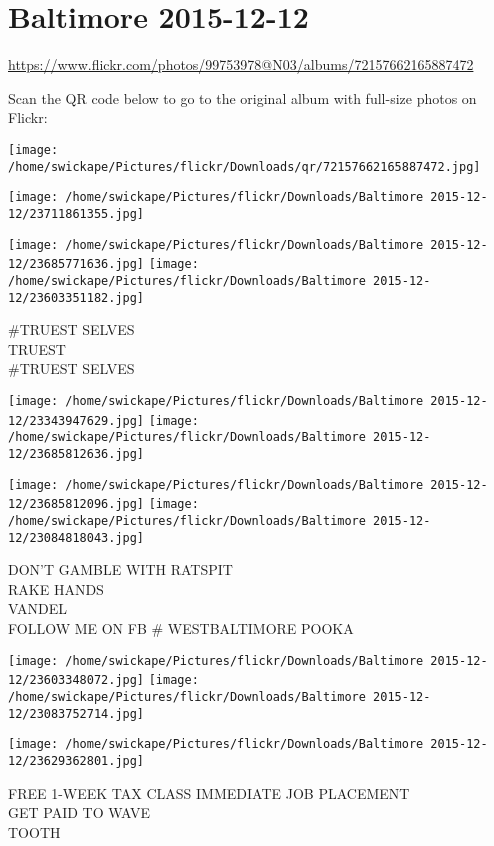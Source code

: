 \documentclass[10pt,letterpaper]{article}
\title{}
\author{}
\date{}
\begin{document}
\section*{Baltimore 2015-12-12}

\url{https://www.flickr.com/photos/99753978@N03/albums/72157662165887472}

Scan the QR code below to go to the original album with full-size photos on Flickr:

\texttt{[image: /home/swickape/Pictures/flickr/Downloads/qr/72157662165887472.jpg]}
\pagebreak

\texttt{[image: /home/swickape/Pictures/flickr/Downloads/Baltimore 2015-12-12/23711861355.jpg]}

\vspace{0.25in}
\texttt{[image: /home/swickape/Pictures/flickr/Downloads/Baltimore 2015-12-12/23685771636.jpg]}
\texttt{[image: /home/swickape/Pictures/flickr/Downloads/Baltimore 2015-12-12/23603351182.jpg]}

\#TRUEST SELVES\\
TRUEST\\
\#TRUEST SELVES
\pagebreak

\texttt{[image: /home/swickape/Pictures/flickr/Downloads/Baltimore 2015-12-12/23343947629.jpg]}
\texttt{[image: /home/swickape/Pictures/flickr/Downloads/Baltimore 2015-12-12/23685812636.jpg]}

\texttt{[image: /home/swickape/Pictures/flickr/Downloads/Baltimore 2015-12-12/23685812096.jpg]}
\texttt{[image: /home/swickape/Pictures/flickr/Downloads/Baltimore 2015-12-12/23084818043.jpg]}

DON'T GAMBLE WITH RATSPIT\\
RAKE HANDS\\
VANDEL\\
FOLLOW ME ON FB \# WESTBALTIMORE POOKA
\pagebreak

\texttt{[image: /home/swickape/Pictures/flickr/Downloads/Baltimore 2015-12-12/23603348072.jpg]}
\texttt{[image: /home/swickape/Pictures/flickr/Downloads/Baltimore 2015-12-12/23083752714.jpg]}

\vspace{0.25in}
\texttt{[image: /home/swickape/Pictures/flickr/Downloads/Baltimore 2015-12-12/23629362801.jpg]}

FREE 1{-}WEEK TAX CLASS IMMEDIATE JOB PLACEMENT\\
GET PAID TO WAVE\\
TOOTH
\pagebreak
\end{document}
